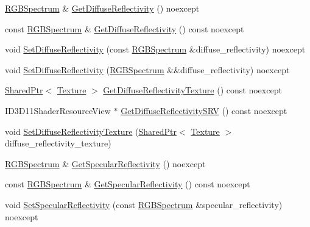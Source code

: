\begin{DoxyCompactItemize}
\item 
\hyperlink{structmage_1_1_r_g_b_spectrum}{R\+G\+B\+Spectrum} \& \hyperlink{structmage_1_1_shaded_material_a3e292664418846588d1e5cdc9ddc8ab5}{Get\+Diffuse\+Reflectivity} () noexcept
\item 
const \hyperlink{structmage_1_1_r_g_b_spectrum}{R\+G\+B\+Spectrum} \& \hyperlink{structmage_1_1_shaded_material_ae2c5d441c51b40a3c940785a002f59ec}{Get\+Diffuse\+Reflectivity} () const noexcept
\item 
void \hyperlink{structmage_1_1_shaded_material_a2da4b314ab2f92659cbed167cc1f32c9}{Set\+Diffuse\+Reflectivity} (const \hyperlink{structmage_1_1_r_g_b_spectrum}{R\+G\+B\+Spectrum} \&diffuse\+\_\+reflectivity) noexcept
\item 
void \hyperlink{structmage_1_1_shaded_material_a672e0afafbad1280c97d2ad909b320c8}{Set\+Diffuse\+Reflectivity} (\hyperlink{structmage_1_1_r_g_b_spectrum}{R\+G\+B\+Spectrum} \&\&diffuse\+\_\+reflectivity) noexcept
\item 
\hyperlink{namespacemage_a1e01ae66713838a7a67d30e44c67703e}{Shared\+Ptr}$<$ \hyperlink{classmage_1_1_texture}{Texture} $>$ \hyperlink{structmage_1_1_shaded_material_a461a080a923578673ce04c83cc3d9dbd}{Get\+Diffuse\+Reflectivity\+Texture} () const noexcept
\item 
I\+D3\+D11\+Shader\+Resource\+View $\ast$ \hyperlink{structmage_1_1_shaded_material_a4e163bd276e41b01973a5d968f6f5716}{Get\+Diffuse\+Reflectivity\+S\+RV} () const noexcept
\item 
void \hyperlink{structmage_1_1_shaded_material_add7475d986df558d289952a6ae2dbd73}{Set\+Diffuse\+Reflectivity\+Texture} (\hyperlink{namespacemage_a1e01ae66713838a7a67d30e44c67703e}{Shared\+Ptr}$<$ \hyperlink{classmage_1_1_texture}{Texture} $>$ diffuse\+\_\+reflectivity\+\_\+texture)
\item 
\hyperlink{structmage_1_1_r_g_b_spectrum}{R\+G\+B\+Spectrum} \& \hyperlink{structmage_1_1_shaded_material_aa13cf6b1af3568471ebd0f93a0bc08ac}{Get\+Specular\+Reflectivity} () noexcept
\item 
const \hyperlink{structmage_1_1_r_g_b_spectrum}{R\+G\+B\+Spectrum} \& \hyperlink{structmage_1_1_shaded_material_a7655315b6654ee4f6f34ac2489ee6f92}{Get\+Specular\+Reflectivity} () const noexcept
\item 
void \hyperlink{structmage_1_1_shaded_material_aa31a28ef31f98adf3ccf1fa83e6db9fb}{Set\+Specular\+Reflectivity} (const \hyperlink{structmage_1_1_r_g_b_spectrum}{R\+G\+B\+Spectrum} \&specular\+\_\+reflectivity) noexcept
\item 

\end{DoxyCompactItemize}
